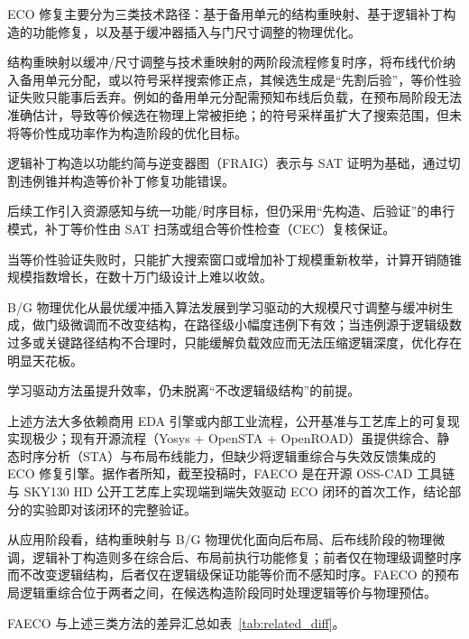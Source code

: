 \documentclass[twocolumn,10pt]{ctexart}
\begin{document}
ECO 修复主要分为三类技术路径：基于备用单元的结构重映射、基于逻辑补丁构造的功能修复，以及基于缓冲器插入与门尺寸调整的物理优化。

结构重映射以缓冲/尺寸调整与技术重映射的两阶段流程修复时序，将布线代价纳入备用单元分配\cite{ho2010eco,ho2012treco}，或以符号采样搜索修正点\cite{kravets2019symbolic}，其候选生成是“先割后验”，等价性验证失败只能事后丢弃。例如\cite{ho2010eco}的备用单元分配需预知布线后负载，在预布局阶段无法准确估计，导致等价候选在物理上常被拒绝；\cite{kravets2019symbolic}的符号采样虽扩大了搜索范围，但未将等价性成功率作为构造阶段的优化目标。

逻辑补丁构造以功能约简与逆变器图（FRAIG）表示与 SAT 证明为基础，通过切割违例锥并构造等价补丁修复功能错误\cite{jiang2010fraig,jiang2016resource}。

后续工作引入资源感知\cite{jiang2016resource}与统一功能/时序目标\cite{lin2011simult,luo2016unified}，但仍采用“先构造、后验证”的串行模式，补丁等价性由 SAT 扫荡或组合等价性检查（CEC）复核保证\cite{mishchenko2006sat,zhong2024stp}。

当等价性验证失败时，只能扩大搜索窗口或增加补丁规模重新枚举\cite{zhuo2018patch}，计算开销随锥规模指数增长，在数十万门级设计上难以收敛。

B/G 物理优化从最优缓冲插入算法\cite{liang2012buffer}发展到学习驱动的大规模尺寸调整与缓冲树生成\cite{liu2021rlsizer,huang2025phys,chen2024aito,zhang2025buffalo}，做门级微调而不改变结构，在路径级小幅度违例下有效；当违例源于逻辑级数过多或关键路径结构不合理时，只能缓解负载效应而无法压缩逻辑深度，优化存在明显天花板\cite{liu2021rlsizer,huang2025phys}。

学习驱动方法\cite{chen2024aito,zhang2025buffalo}虽提升效率，仍未脱离“不改逻辑级结构”的前提。

上述方法大多依赖商用 EDA 引擎或内部工业流程，公开基准与工艺库上的可复现实现极少；现有开源流程（Yosys\cite{yosys} + OpenSTA\cite{opensta} + OpenROAD\cite{openroad}）虽提供综合、静态时序分析（STA）与布局布线能力，但缺少将逻辑重综合与失效反馈集成的 ECO 修复引擎。据作者所知，截至投稿时，FAECO 是在开源 OSS-CAD 工具链与 SKY130 HD\cite{sky130} 公开工艺库上实现端到端失效驱动 ECO 闭环的首次工作，结论部分的实验即对该闭环的完整验证。

从应用阶段看，结构重映射与 B/G 物理优化面向后布局、后布线阶段的物理微调，逻辑补丁构造则多在综合后、布局前执行功能修复；前者仅在物理级调整时序而不改变逻辑结构，后者仅在逻辑级保证功能等价而不感知时序。FAECO 的预布局逻辑重综合位于两者之间，在候选构造阶段同时处理逻辑等价与物理预估。

FAECO 与上述三类方法的差异汇总如表~\ref{tab:related_diff}。
\end{document}
